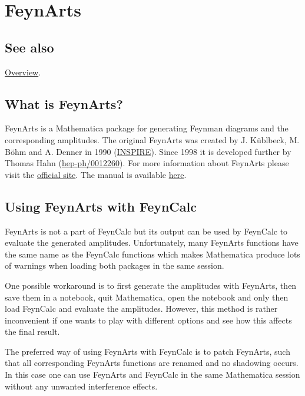 \documentclass[../FeynCalcManual.tex]{subfiles}
\begin{document}
\hypertarget{feynarts}{
\section{FeynArts}\label{feynarts}}

\subsection{See also}

\hyperlink{toc}{Overview}.

\subsection{What is FeynArts?}\label{what-is-feynarts}

FeynArts is a Mathematica package for generating Feynman diagrams and
the corresponding amplitudes. The original FeynArts was created by J.
Küblbeck, M. Böhm and A. Denner in 1990
(\href{http://inspirehep.net/record/27276}{INSPIRE}). Since 1998 it is
developed further by Thomas Hahn
(\href{http://arxiv.org/abs/hep-ph/0012260}{hep-ph/0012260}). For more
information about FeynArts please visit the
\href{http://www.feynarts.de/}{official site}. The manual is available
\href{http://www.feynarts.de/FA3Guide.pdf}{here}.

\subsection{Using FeynArts with
FeynCalc}\label{using-feynarts-with-feyncalc}

FeynArts is not a part of FeynCalc but its output can be used by
FeynCalc to evaluate the generated amplitudes. Unfortunately, many
FeynArts functions have the same name as the FeynCalc functions which
makes Mathematica produce lots of warnings when loading both packages in
the same session.

One possible workaround is to first generate the amplitudes with
FeynArts, then save them in a notebook, quit Mathematica, open the
notebook and only then load FeynCalc and evaluate the amplitudes.
However, this method is rather inconvenient if one wants to play with
different options and see how this affects the final result.

The preferred way of using FeynArts with FeynCalc is to patch FeynArts,
such that all corresponding FeynArts functions are renamed and no
shadowing occurs. In this case one can use FeynArts and FeynCalc in the
same Mathematica session without any unwanted interference effects.
\end{document}
